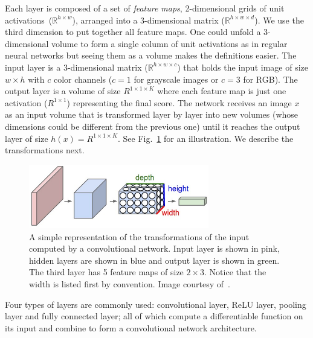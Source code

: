 Each layer is composed of a set of \emph{feature maps}, 2-dimensional grids of unit activations~($\mathbb{R}^{h\times w}$), arranged into a 3-dimensional matrix ($\mathbb{R}^{h\times w \times d}$). We use the third dimension to put together all feature maps. One could unfold a 3-dimensional volume to form a single column of unit activations as in regular neural networks but seeing them as a volume makes the definitions easier. The input layer is a 3-dimensional matrix ($\mathbb{R}^{h\times w \times c}$) that holds the input image of size $w\times h$ with $c$ color channels ($c = 1$ for grayscale images or $c = 3$ for RGB). The output layer is a volume of size $R^{1\times 1 \times K}$ where each feature map is just one activation ($R^{1\times 1}$) representing the final score. The network receives an image $x$ as an input volume that is transformed layer by layer into new volumes (whose dimensions could be different from the previous one) until it reaches the output layer of size $h(x) = R^{1\times 1 \times K}$. See Fig.~\ref{fig:ConvNetVolumes} for an illustration. We describe the transformations next.
\begin{figure}[h]
	\centering
	\includegraphics[width = 0.7\textwidth]{plots/convNetVolumes.jpeg}
	\caption[Convolutional network visualization]{A simple representation of the transformations of the input computed by a convolutional network. Input layer is shown in pink, hidden layers are shown in blue and output layer is shown in green. The third layer has 5 feature maps of size $2\times3$. Notice that the width is listed first by convention. Image courtesy of~\cite{Karpathy2015}.}
	\label{fig:ConvNetVolumes}
\end{figure}

Four types of layers are commonly used: convolutional layer, ReLU layer, pooling layer and fully connected layer; all of which compute a differentiable function on its input and combine to form a convolutional network architecture.

